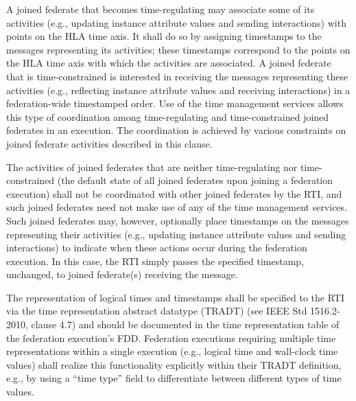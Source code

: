 \begin{compactstdpage}
    A joined federate that becomes time-regulating may associate some of its activities (e.g., updating instance attribute values and sending interactions) with points on the HLA time axis. It shall do so by assigning timestamps to the messages representing its activities; these timestamps correspond to the points on the HLA time axis with which the activities are associated. A joined federate that is time-constrained is interested in receiving the messages representing these activities (e.g., reflecting instance attribute values and receiving interactions) in a federation-wide timestamped order. Use of the time management services allows this type of coordination among time-regulating and time-constrained joined federates in an execution. The coordination is achieved by various constraints on joined federate activities described in this clause.

    The activities of joined federates that are neither time-regulating nor time-constrained (the default state of all joined federates upon joining a federation execution) shall not be coordinated with other joined federates by the RTI, and such joined federates need not make use of any of the time management services. Such joined federates may, however, optionally place timestamps on the messages representing their activities (e.g., updating instance attribute values and sending interactions) to indicate when these actions occur during the federation execution. In this case, the RTI simply passes the specified timestamp, unchanged, to joined federate(s) receiving the message.

    The representation of logical times and timestamps shall be specified to the RTI via the time representation abstract datatype (TRADT) (see IEEE Std 1516.2-2010, clause 4.7) and should be documented in the time representation table of the federation execution's FDD. Federation executions requiring multiple time representations within a single execution (e.g., logical time and wall-clock time values) shall realize this functionality explicitly within their TRADT definition, e.g., by using a ``time type'' field to differentiate between different types of time values.


\end{compactstdpage}

\clearpage

